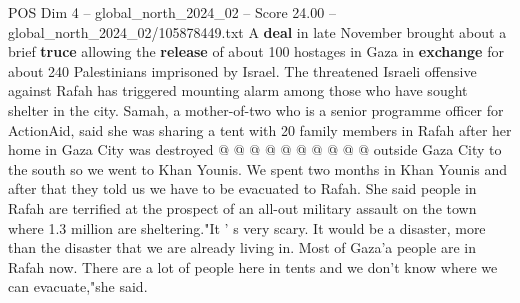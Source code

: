 \begin{textsample}{POS Dim 4 – global\_north\_2024\_02 – Score 24.00 – global\_north\_2024\_02/105878449.txt}
A \textbf{deal} in late November brought about a brief \textbf{truce} allowing the \textbf{release} of about 100 hostages in Gaza in \textbf{exchange} for about 240 Palestinians imprisoned by Israel.
The threatened Israeli offensive against Rafah has triggered mounting alarm among those who have sought shelter in the city.
Samah, a mother-of-two who is a senior programme officer for ActionAid, said she was sharing a tent with 20 family members in Rafah after her home in Gaza City was destroyed @ @ @ @ @ @ @ @ @ @ outside Gaza City to the south so we went to Khan Younis.
We spent two months in Khan Younis and after that they told us we have to be evacuated to Rafah.
She said people in Rafah are terrified at the prospect of an all-out military assault on the town where 1.3 million are sheltering."It ' s very scary.
It would be a disaster, more than the disaster that we are already living in.
Most of Gaza'a people are in Rafah now.
There are a lot of people here in tents and we don't know where we can evacuate,"she said.

\end{textsample}
